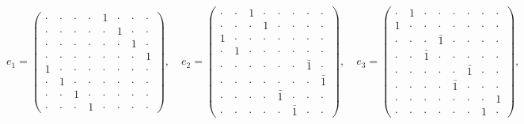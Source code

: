 \begin{center}
\scriptsize
\setlength{\arraycolsep}{2.2pt}
\[e_1=\begin{pmatrix}\cdot&\cdot&\cdot&\cdot&1&\cdot&\cdot&\cdot\\\cdot&\cdot&\cdot&\cdot&\cdot&1&\cdot&\cdot\\\cdot&\cdot&\cdot&\cdot&\cdot&\cdot&1&\cdot\\\cdot&\cdot&\cdot&\cdot&\cdot&\cdot&\cdot&1\\1&\cdot&\cdot&\cdot&\cdot&\cdot&\cdot&\cdot\\\cdot&1&\cdot&\cdot&\cdot&\cdot&\cdot&\cdot\\\cdot&\cdot&1&\cdot&\cdot&\cdot&\cdot&\cdot\\\cdot&\cdot&\cdot&1&\cdot&\cdot&\cdot&\cdot\end{pmatrix},\quad e_2=\begin{pmatrix}\cdot&\cdot&1&\cdot&\cdot&\cdot&\cdot&\cdot\\\cdot&\cdot&\cdot&1&\cdot&\cdot&\cdot&\cdot\\1&\cdot&\cdot&\cdot&\cdot&\cdot&\cdot&\cdot\\\cdot&1&\cdot&\cdot&\cdot&\cdot&\cdot&\cdot\\\cdot&\cdot&\cdot&\cdot&\cdot&\cdot&\bar1&\cdot\\\cdot&\cdot&\cdot&\cdot&\cdot&\cdot&\cdot&\bar1\\\cdot&\cdot&\cdot&\cdot&\bar1&\cdot&\cdot&\cdot\\\cdot&\cdot&\cdot&\cdot&\cdot&\bar1&\cdot&\cdot\end{pmatrix},\quad e_3=\begin{pmatrix}\cdot&1&\cdot&\cdot&\cdot&\cdot&\cdot&\cdot\\1&\cdot&\cdot&\cdot&\cdot&\cdot&\cdot&\cdot\\\cdot&\cdot&\cdot&\bar1&\cdot&\cdot&\cdot&\cdot\\\cdot&\cdot&\bar1&\cdot&\cdot&\cdot&\cdot&\cdot\\\cdot&\cdot&\cdot&\cdot&\cdot&\bar1&\cdot&\cdot\\\cdot&\cdot&\cdot&\cdot&\bar1&\cdot&\cdot&\cdot\\\cdot&\cdot&\cdot&\cdot&\cdot&\cdot&\cdot&1\\\cdot&\cdot&\cdot&\cdot&\cdot&\cdot&1&\cdot\end{pmatrix},\]
\[
\]
\end{center}
